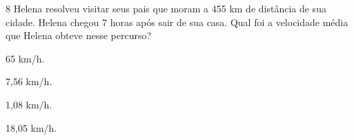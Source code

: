 







\num{8} Helena resolveu visitar seus pais que moram a 455 km de distância de
sua cidade. Helena chegou 7 horas após sair de sua casa. Qual foi a
velocidade média que Helena obteve nesse percurso?

\begin{escolha}
\item 65 km/h.
\item 7,56 km/h.
\item 1,08 km/h.
\item 18,05 km/h.
\end{escolha}










